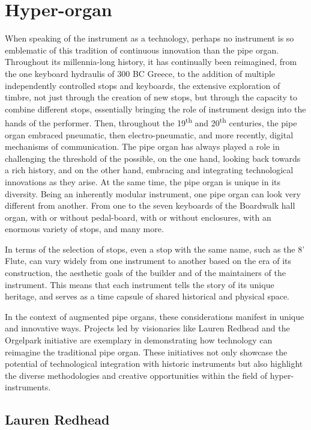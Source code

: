 \documentclass[12pt,twoside,maitrise]{dms_ks}
\theoremstyle{definition}
\begin{document}
{{\section{Hyper-organ}

When speaking of the instrument as a technology, perhaps no instrument is so emblematic of this tradition of continuous innovation than the pipe organ. 
Throughout its millennia-long history, it has continually been reimagined, from the one keyboard hydraulis of 300 BC Greece, to the addition of multiple independently controlled stops and keyboards, the extensive exploration of timbre, not just through the creation of new stops, but through the capacity to combine different stops, essentially bringing the role of instrument design into the hands of the performer. 
Then, throughout the 19\textsuperscript{th} and 20\textsuperscript{th} centuries, the pipe organ embraced pneumatic, then electro-pneumatic, and more recently, digital mechanisms of communication. 
The pipe organ has always played a role in challenging the threshold of the possible, on the one hand, looking back towards a rich history, and on the other hand, embracing and integrating technological innovations as they arise. 
At the same time, the pipe organ is unique in its diversity. 
Being an inherently modular instrument, one pipe organ can look very different from another. 
From one to the seven keyboards of the Boardwalk hall organ, with or without pedal-board, with or without enclosures, with an enormous variety of stops, and many more. 

In terms of the selection of stops, even a stop with the same name, such as the 8' Flute, can vary widely from one instrument to another based on the era of its construction, the aesthetic goals of the builder and of the maintainers of the instrument. 
This means that each instrument tells the story of its unique heritage, and serves as a time capsule of shared historical and physical space.

In the context of augmented pipe organs, these considerations manifest in unique and innovative ways.
Projects led by visionaries like Lauren Redhead and the Orgelpark initiative are exemplary in demonstrating how technology can reimagine the traditional pipe organ.
These initiatives not only showcase the potential of technological integration with historic instruments but also highlight the diverse methodologies and creative opportunities within the field of hyper-instruments.

\subsection{Lauren Redhead}

}}
\end{document}
